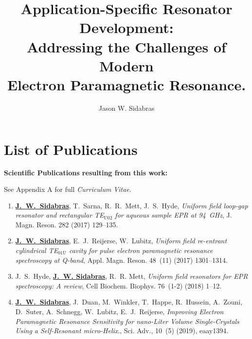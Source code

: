 \documentclass[11pt,a4paper,openany,twoside,english,titlepage=true]{scrbook}
\author{Jason W. Sidabras}
\title{\textbf{Application-Specific Resonator Development:} \\ Addressing the Challenges of Modern \\ Electron Paramagnetic Resonance.}
\begin{document}
\raggedbottom
{}

\maketitle






\newpage

\chapter*{List of Publications}

\textbf{Scientific Publications resulting from this work: }

See Appendix A for full \textit{Curriculum Vitae}.
\begin{enumerate}
\itemsep0em
    \item \textbf{\underline{J.~W.~Sidabras}}, T.~Sarna, R.~R.~Mett, J.~S.~Hyde, {\em Uniform field loop-gap
  resonator and rectangular {TE}$_{\text{{U}02}}$ for aqueous sample {EPR} at 94~{GHz}}, J. Magn. Reson. 282 (2017) 129--135.
    \item \textbf{\underline{J.~W.~Sidabras}}, E.~J.~Reijerse, W.~Lubitz, {\em Uniform field re-entrant cylindrical
  {TE}$_{\text{01{U}}}$ cavity for pulse electron paramagnetic resonance spectroscopy at {Q}-band}, Appl. Magn. Reson. 48~(11) (2017) 1301--1314.
    \item J.~S.~Hyde, \textbf{\underline{J.~W. Sidabras}}, R.~R. Mett, {\em Uniform field resonators for {EPR}
  spectroscopy: A review}, Cell Biochem. Biophys. 76~(1-2) (2018) 1--12.
    \item \textbf{\underline{J.~W.~Sidabras}}, J.~Duan, M.~Winkler, T.~Happe, R.~Hussein, A.~Zouni, D.~Suter,
  A.~Schnegg, W.~Lubitz, E.~J.~Reijerse, {\em Improving Electron Paramagnetic Resonance Sensitivity for nano-Liter Volume Single-Crystals Using a Self-Resonant micro-Helix}., Sci. Adv., 10~(5) (2019), eaay1394.
\end{enumerate}

\newpage
\makeatletter
\renewcommand{\@pnumwidth}{1.75em} 
\renewcommand{\@tocrmarg}{2em}
\makeatother
\tableofcontents\newpage
\end{document}
